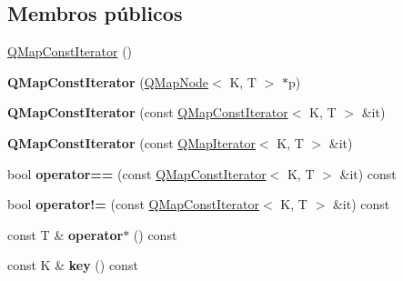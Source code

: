 \subsection*{Membros públicos}
\begin{DoxyCompactItemize}
\item 
\hyperlink{class_q_map_const_iterator_aec58d5a5f71a4ae8b9a7db55c37774a8}{Q\-Map\-Const\-Iterator} ()
\item 
\hypertarget{class_q_map_const_iterator_a5b9bf15a87a7f96449e56a8591dec22e}{{\bfseries Q\-Map\-Const\-Iterator} (\hyperlink{struct_q_map_node}{Q\-Map\-Node}$<$ K, T $>$ $\ast$p)}\label{class_q_map_const_iterator_a5b9bf15a87a7f96449e56a8591dec22e}

\item 
\hypertarget{class_q_map_const_iterator_ab35dc57f8adf1a6054135cc44dbc6b68}{{\bfseries Q\-Map\-Const\-Iterator} (const \hyperlink{class_q_map_const_iterator}{Q\-Map\-Const\-Iterator}$<$ K, T $>$ \&it)}\label{class_q_map_const_iterator_ab35dc57f8adf1a6054135cc44dbc6b68}

\item 
\hypertarget{class_q_map_const_iterator_ab3cef99d2a2ee59fcc3c64812c4dab6f}{{\bfseries Q\-Map\-Const\-Iterator} (const \hyperlink{class_q_map_iterator}{Q\-Map\-Iterator}$<$ K, T $>$ \&it)}\label{class_q_map_const_iterator_ab3cef99d2a2ee59fcc3c64812c4dab6f}

\item 
\hypertarget{class_q_map_const_iterator_a73607511833822e4c55f66cfbca16bc5}{bool {\bfseries operator==} (const \hyperlink{class_q_map_const_iterator}{Q\-Map\-Const\-Iterator}$<$ K, T $>$ \&it) const }\label{class_q_map_const_iterator_a73607511833822e4c55f66cfbca16bc5}

\item 
\hypertarget{class_q_map_const_iterator_ac369c585f5b9393451ddf6e87e5da9a4}{bool {\bfseries operator!=} (const \hyperlink{class_q_map_const_iterator}{Q\-Map\-Const\-Iterator}$<$ K, T $>$ \&it) const }\label{class_q_map_const_iterator_ac369c585f5b9393451ddf6e87e5da9a4}

\item 
\hypertarget{class_q_map_const_iterator_a0ad02595c2fdf7a496eda1d646060eab}{const T \& {\bfseries operator$\ast$} () const }\label{class_q_map_const_iterator_a0ad02595c2fdf7a496eda1d646060eab}

\item 
\hypertarget{class_q_map_const_iterator_ad3258d2da7673cb912692ea56ce149d5}{const K \& {\bfseries key} () const }\label{class_q_map_const_iterator_ad3258d2da7673cb912692ea56ce149d5}


\end{DoxyCompactItemize}
